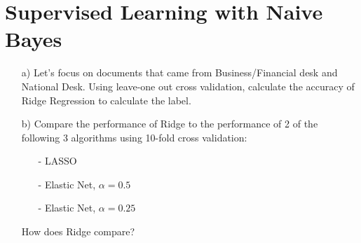 \documentclass[12pt,letterpaper]{article}
\begin{document}
\section{Supervised Learning with Naive Bayes}

\begin{itemize}
\item[a)] Let's focus on documents that came from Business/Financial desk and National Desk.  Using leave-one out cross validation, calculate the accuracy of Ridge Regression to calculate the label.
\item[b)] Compare the performance of Ridge to the performance of 2 of the following 3 algorithms using 10-fold cross validation:
\begin{itemize}
\item[-] LASSO 
\item[-] Elastic Net, $\alpha = 0.5$ 
\item[-] Elastic Net, $\alpha = 0.25$ 
\end{itemize}
How does Ridge compare? 
\end{itemize}
\end{document}
